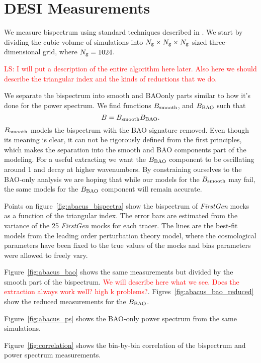 \section{DESI Measurements}\label{sec:measurements}

We measure bispectrum using standard techniques described in \cite{}. We start by dividing the cubic volume of simulations into $N_\mathrm{g} \times N_\mathrm{g}\times N_\mathrm{g}$ sized three-dimensional grid, where $N_\mathrm{g} = 1024$.

\textcolor{red}{LS: I will put a description of the entire algorithm here later. Also here we should describe the triangular index and the kinds of reductions that we do.}

We separate the bispectrum into smooth and BAOonly parts similar to how it's done for the power spectrum. We find functions $B_\mathrm{smooth}$, and $B_\mathrm{BAO}$ such that
\begin{equation}
    B = B_\mathrm{smooth}B_\mathrm{BAO}.
\end{equation}
$B_\mathrm{smooth}$ models the bispectrum with the BAO signature removed. Even though its meaning is clear, it can not be rigorously defined from the first principles, which makes the separation into the smooth and BAO components part of the modeling. For a useful extracting we want the $B_\mathrm{BAO}$ component to be oscillating around 1 and decay at higher wavenumbers. By constraining ourselves to the BAO-only analysis we are hoping that while our models for the $B_\mathrm{smooth}$ may fail, the same models for the $B_\mathrm{BAO}$ component will remain accurate.


Points on figure~\ref{fig:abacus_bispectra} show the bispectrum of \textit{FirstGen} mocks as a function of the triangular index. The error bars are estimated from the variance of the 25 \textit{FirstGen} mocks for each tracer. The lines are the best-fit models from the leading order perturbation theory model, where the cosmological parameters have been fixed to the true values of the mocks and bias parameters were allowed to freely vary.  

Figure~\ref{fig:abacus_bao} shows the same measurements but divided by the smooth part of the bispectrum. \textcolor{red}{We will describe here what we see. Does the extraction always work well? high k problems?}. Figres~\ref{fig:abacus_bao_reduced} show the reduced measurements for the $B_\mathrm{BAO}$.

Figure~\ref{fig:abacus_ps} shows the BAO-only power spectrum from the same simulations. 

Figure~\ref{fig:correlation} shows the bin-by-bin correlation of the bispectrum and power spectrum measurements.